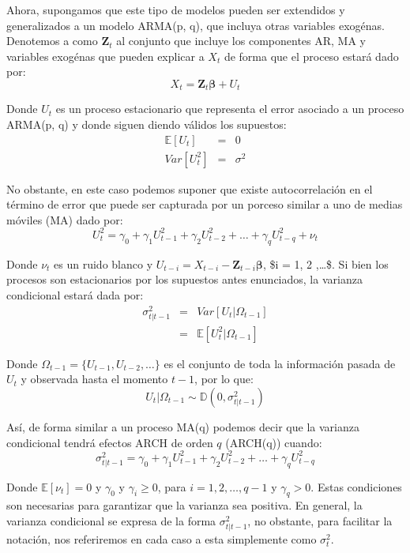 \documentclass[
  a4paper,
]{article}
\begin{document}
Ahora, supongamos que este tipo de modelos pueden ser extendidos y
generalizados a un modelo ARMA(p, q), que incluya otras variables
exogénas. Denotemos a como \(\mathbf{Z}_t\) al conjunto que incluye los
componentes AR, MA y variables exogénas que pueden explicar a \(X_t\) de
forma que el proceso estará dado por: \[
    X_t = \mathbf{Z}_t \boldsymbol{\beta} + U_t
\]

Donde \(U_t\) es un proceso estacionario que representa el error
asociado a un proceso ARMA(p, q) y donde siguen diendo válidos los
supuestos: \begin{eqnarray*}
    \mathbb{E}[U_t] & = & 0 \\
    Var[U_t^2] & = & \sigma^2
\end{eqnarray*}

No obstante, en este caso podemos suponer que existe autocorrelación en
el término de error que puede ser capturada por un porceso similar a uno
de medias móviles (MA) dado por: \[
    U_t^2 = \gamma_0 + \gamma_1 U_{t-1}^2 + \gamma_2 U_{t-2}^2 + \ldots + \gamma_q U_{t-q}^2 + \nu_t
\]

Donde \(\nu_t\) es un ruido blanco y
\(U_{t-i} = X_{t-i} - \mathbf{Z}_{t-i} \boldsymbol{\beta}\), \$i = 1, 2
,\ldots \$. Si bien los procesos son estacionarios por los supuestos
antes enunciados, la varianza condicional estará dada por:
\begin{eqnarray*}
    \sigma^2_{t | t-1} & = & Var[ U_t | \Omega_{t-1} ] \\
    & = & \mathbb{E}[ U^2_t | \Omega_{t-1} ]
\end{eqnarray*}

Donde \(\Omega_{t-1} = \{U_{t-1}, U_{t-2}, \ldots \}\) es el conjunto de
toda la información pasada de \(U_t\) y observada hasta el momento
\(t-1\), por lo que: \begin{equation*}
    U_t | \Omega_{t-1} \sim \mathbb{D}(0, \sigma^2_{t | t-1})
\end{equation*}

Así, de forma similar a un proceso MA(q) podemos decir que la varianza
condicional tendrá efectos ARCH de orden \(q\) (ARCH(q)) cuando: \[
    \sigma^2_{t | t-1} = \gamma_0 + \gamma_1 U_{t-1}^2 + \gamma_2 U_{t-2}^2 + \ldots + \gamma_q U_{t-q}^2
    \label{ARCH_Effect}
\]

Donde \(\mathbb{E}[\nu_t] = 0\) y \(\gamma_0\) y \(\gamma_i \geq 0\),
para \(i = 1, 2, \ldots, q-1\) y \(\gamma_q > 0\). Estas condiciones son
necesarias para garantizar que la varianza sea positiva. En general, la
varianza condicional se expresa de la forma \(\sigma^2_{t | t-1}\), no
obstante, para facilitar la notación, nos referiremos en cada caso a
esta simplemente como \(\sigma^2_{t}\).
\end{document}
